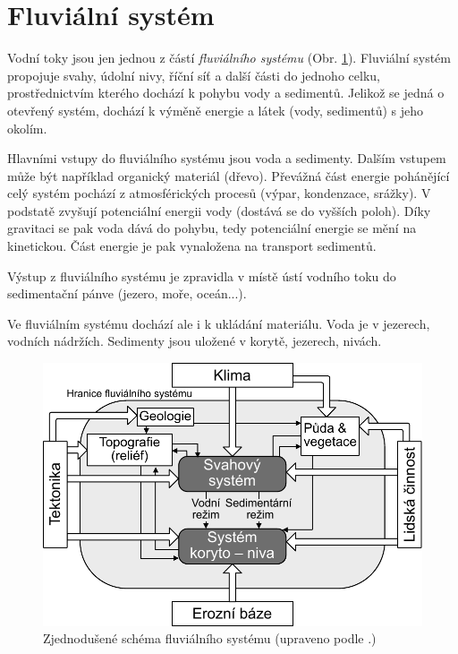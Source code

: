 \section{Fluviální systém}
Vodní toky jsou jen jednou z částí \emph{fluviálního systému} (Obr. \ref{fig:fluvsystem}). Fluviální systém propojuje svahy, údolní nivy, říční síť a další části do jednoho celku, prostřednictvím kterého dochází k pohybu vody a sedimentů. Jelikož se jedná o otevřený systém, dochází k výměně energie a látek (vody, sedimentů) s jeho okolím. 

Hlavními vstupy do fluviálního systému jsou voda a sedimenty. Dalším vstupem může být například organický materiál (dřevo). Převážná část energie pohánějící celý systém pochází z atmosférických procesů (výpar, kondenzace, srážky). V podstatě zvyšují potenciální energii vody (dostává se do vyšších poloh). Díky gravitaci se pak voda dává do pohybu, tedy potenciální energie se mění na kinetickou. Část energie je pak vynaložena na transport sedimentů.

Výstup z fluviálního systému je zpravidla v místě ústí vodního toku do sedimentační pánve (jezero, moře, oceán...). 

Ve fluviálním systému dochází ale i k ukládání materiálu. Voda je v jezerech, vodních nádržích. Sedimenty jsou uložené v korytě, jezerech, nivách.

\begin{figure}
	\centering
	\includegraphics[width=0.9\linewidth]{obrazky/fluvial/fluv_system}
	\caption{Zjednodušené schéma fluviálního systému (upraveno podle \textcite{charltonFundamentalsFluvialGeomorphology2007}.)}
	\label{fig:fluvsystem}
\end{figure}

